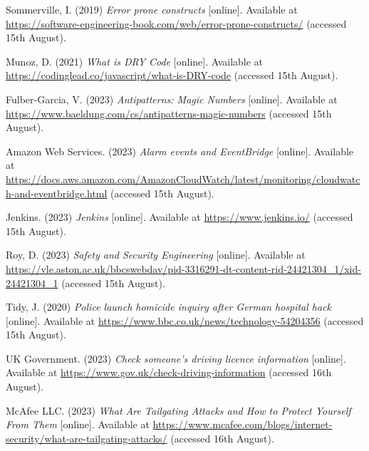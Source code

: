  \noindent [34] Sommerville, I. (2019) \textit{Error prone constructs} [online]. Available at \url{https://software-engineering-book.com/web/error-prone-constructs/} (accessed 15th August).
 \vspace{0.2cm}

 \noindent [35] Munoz, D. (2021) \textit{What is DRY Code} [online]. Available at \url{https://codinglead.co/javascript/what-is-DRY-code} (accessed 15th August).
 \vspace{0.2cm}

 \noindent [36] Fulber-Garcia, V. (2023) \textit{Antipatterns: Magic Numbers} [online]. Available at \url{https://www.baeldung.com/cs/antipatterns-magic-numbers} (accessed 15th August).
 \vspace{0.2cm}

 \noindent [37] Amazon Web Services. (2023) \textit{Alarm events and EventBridge} [online]. Available at \url{https://docs.aws.amazon.com/AmazonCloudWatch/latest/monitoring/cloudwatch-and-eventbridge.html} (accessed 15th August).
 \vspace{0.2cm}

 \noindent [38] Jenkins. (2023) \textit{Jenkins} [online]. Available at \url{https://www.jenkins.io/} (accessed 15th August).
 \vspace{0.2cm}

 \noindent [39] Roy, D. (2023) \textit{Safety and Security Engineering} [online]. Available at \url{https://vle.aston.ac.uk/bbcswebdav/pid-3316291-dt-content-rid-24421304_1/xid-24421304_1} (accessed 15th August).
 \vspace{0.2cm}

 \noindent [40] Tidy, J. (2020) \textit{Police launch homicide inquiry after German hospital hack} [online]. Available at \url{https://www.bbc.co.uk/news/technology-54204356} (accessed 15th August).
 \vspace{0.2cm}

 \noindent [41] UK Government. (2023) \textit{Check someone's driving licence information} [online]. Available at \url{https://www.gov.uk/check-driving-information} (accessed 16th August).
 \vspace{0.2cm}

 \noindent [42] McAfee LLC. (2023) \textit{What Are Tailgating Attacks and How to Protect Yourself From Them} [online]. Available at \url{https://www.mcafee.com/blogs/internet-security/what-are-tailgating-attacks/} (accessed 16th August).
 \vspace{0.2cm}

